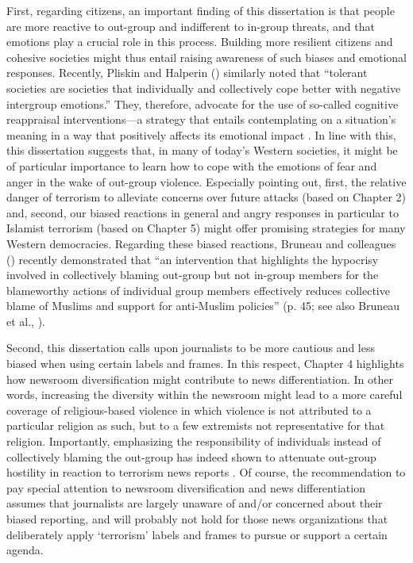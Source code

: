 First, regarding citizens, an important finding of this dissertation is that people are more reactive to out-group and indifferent to in-group threats, and that emotions play a crucial role in this process. Building more resilient citizens and cohesive societies might thus entail raising awareness of such biases and emotional responses. Recently, Pliskin and Halperin (\citeyear[][p. 93]{Pliskin2020}) similarly noted that ``tolerant societies are societies that individually and collectively cope better with negative intergroup emotions.'' They, therefore, advocate for the use of so-called cognitive reappraisal interventions---a strategy that entails contemplating on a situation's meaning in a way that positively affects its emotional impact \citep[for more information, see][]{Pliskin2020, Halperin2014}. In line with this, this dissertation suggests that, in many of today's Western societies, it might be of particular importance to learn how to cope with the emotions of fear and anger in the wake of out-group violence. Especially pointing out, first, the relative danger of terrorism to alleviate concerns over future attacks (based on Chapter 2) and, second, our biased reactions in general and angry responses in particular to Islamist terrorism (based on Chapter 5) might offer promising strategies for many Western democracies. Regarding these biased reactions, Bruneau and colleagues (\citeyear{Bruneau2019}) recently demonstrated that ``an intervention that highlights the hypocrisy involved in collectively blaming out-group but not in-group members for the blameworthy actions of individual group members effectively reduces collective blame of Muslims and support for anti-Muslim policies'' (p. 45; see also Bruneau et al., \citeyear{Bruneau2018}).


Second, this dissertation calls upon journalists to be more cautious and less biased when using certain labels and frames. In this respect, Chapter 4 highlights how newsroom diversification might contribute to news differentiation. In other words, increasing the diversity within the newsroom might lead to a more careful coverage of religious-based violence in which violence is not attributed to a particular religion as such, but to a few extremists not representative for that religion. Importantly, emphasizing the responsibility of individuals instead of collectively blaming the out-group has indeed shown to attenuate out-group hostility in reaction to terrorism news reports \citep[][this is also in keeping with Bruneau et al.'s, 2020, `collective blame hypocrisy' intervention]{VonSikorski2017}. Of course, the recommendation to pay special attention to newsroom diversification and news differentiation assumes that journalists are largely unaware of and/or concerned about their biased reporting, and will probably not hold for those news organizations that deliberately apply `terrorism' labels and frames to pursue or support a certain agenda.


